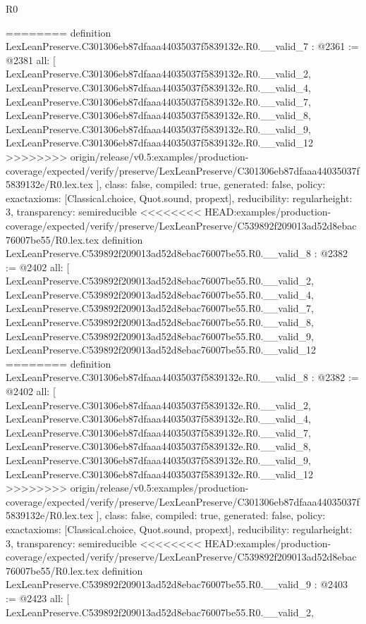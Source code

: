 \begin{lexlean}{R0}
\begin{coremodule}
{{{{{{{{{{{{{{{{{{{{{{{{{{{{{{{{{{{{{{{{{{{{{{========
definition LexLeanPreserve.C301306eb87dfaaa44035037f5839132e.R0.__valid_7 : @2361 := @2381 {
  all: [
    LexLeanPreserve.C301306eb87dfaaa44035037f5839132e.R0.__valid_2,
    LexLeanPreserve.C301306eb87dfaaa44035037f5839132e.R0.__valid_4,
    LexLeanPreserve.C301306eb87dfaaa44035037f5839132e.R0.__valid_7,
    LexLeanPreserve.C301306eb87dfaaa44035037f5839132e.R0.__valid_8,
    LexLeanPreserve.C301306eb87dfaaa44035037f5839132e.R0.__valid_9,
    LexLeanPreserve.C301306eb87dfaaa44035037f5839132e.R0.__valid_12
>>>>>>>> origin/release/v0.5:examples/production-coverage/expected/verify/preserve/LexLeanPreserve/C301306eb87dfaaa44035037f5839132e/R0.lex.tex
  ],
  class: false,
  compiled: true,
  generated: false,
  policy: exact{axioms: [Classical.choice, Quot.sound, propext]},
  reducibility: regular{height: 3},
  transparency: semireducible
}
<<<<<<<< HEAD:examples/production-coverage/expected/verify/preserve/LexLeanPreserve/C539892f209013ad52d8ebac76007be55/R0.lex.tex
definition LexLeanPreserve.C539892f209013ad52d8ebac76007be55.R0.__valid_8 : @2382 := @2402 {
  all: [
    LexLeanPreserve.C539892f209013ad52d8ebac76007be55.R0.__valid_2,
    LexLeanPreserve.C539892f209013ad52d8ebac76007be55.R0.__valid_4,
    LexLeanPreserve.C539892f209013ad52d8ebac76007be55.R0.__valid_7,
    LexLeanPreserve.C539892f209013ad52d8ebac76007be55.R0.__valid_8,
    LexLeanPreserve.C539892f209013ad52d8ebac76007be55.R0.__valid_9,
    LexLeanPreserve.C539892f209013ad52d8ebac76007be55.R0.__valid_12
========
definition LexLeanPreserve.C301306eb87dfaaa44035037f5839132e.R0.__valid_8 : @2382 := @2402 {
  all: [
    LexLeanPreserve.C301306eb87dfaaa44035037f5839132e.R0.__valid_2,
    LexLeanPreserve.C301306eb87dfaaa44035037f5839132e.R0.__valid_4,
    LexLeanPreserve.C301306eb87dfaaa44035037f5839132e.R0.__valid_7,
    LexLeanPreserve.C301306eb87dfaaa44035037f5839132e.R0.__valid_8,
    LexLeanPreserve.C301306eb87dfaaa44035037f5839132e.R0.__valid_9,
    LexLeanPreserve.C301306eb87dfaaa44035037f5839132e.R0.__valid_12
>>>>>>>> origin/release/v0.5:examples/production-coverage/expected/verify/preserve/LexLeanPreserve/C301306eb87dfaaa44035037f5839132e/R0.lex.tex
  ],
  class: false,
  compiled: true,
  generated: false,
  policy: exact{axioms: [Classical.choice, Quot.sound, propext]},
  reducibility: regular{height: 3},
  transparency: semireducible
}
<<<<<<<< HEAD:examples/production-coverage/expected/verify/preserve/LexLeanPreserve/C539892f209013ad52d8ebac76007be55/R0.lex.tex
definition LexLeanPreserve.C539892f209013ad52d8ebac76007be55.R0.__valid_9 : @2403 := @2423 {
  all: [
    LexLeanPreserve.C539892f209013ad52d8ebac76007be55.R0.__valid_2,
}}}}}}}}}}}}}}}}}}}}}}}}}}}}}}}}}}}}}}}}}}}}}}}}
\end{coremodule}
\end{lexlean}

